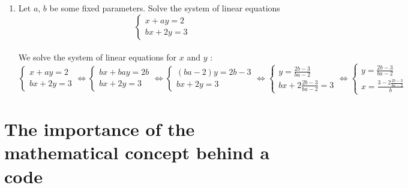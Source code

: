 \documentclass[a4paper]{article}
\begin{document}
\begin{enumerate}
    
    \item Let $a$, $b$ be some fixed parameters. Solve the system of linear equations
    \[
    \begin{cases*}
    x + ay = 2 \\
    bx + 2y = 3
    \end{cases*}
    \]
    \hrulefill\\
    We solve the system of linear equations for $x$ and $y$ :\\
$\begin{cases}x+ay=2\\bx+2y=3\end{cases} \Leftrightarrow \begin{cases}bx+bay=2b\\bx+2y=3\end{cases} \Leftrightarrow \begin{cases}(ba-2)y=2b-3\\bx+2y=3\end{cases} \Leftrightarrow \begin{cases}y=\frac{2b-3}{ba-2}\\bx+2\frac{2b-3}{ba-2}=3\end{cases} \Leftrightarrow \begin{cases}y=\frac{2b-3}{ba-2}\\x=\frac{3-2\frac{2b-3}{ba-2}}{b}\end{cases}$

        
\end{enumerate}

% 
% 
\clearpage
\section{The importance of the mathematical concept behind a code}
\end{document}

